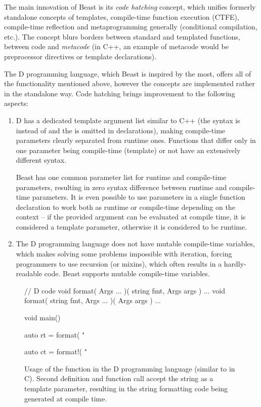 \documentclass{ExcelAtFIT}
\begin{document}
The main innovation of Beast is its \textit{code hatching} concept, which unifies formerly standalone concepts of templates, compile-time function execution (CTFE), compile-time reflection and metaprogramming generally (conditional compilation, etc.). The concept blurs borders between standard and templated functions, between code and \textit{metacode} (in C++, an example of metacode would be preprocessor directives or template declarations).

The D programming language, which Beast is inspired by the most, offers all of the functionality mentioned above, however the concepts are implemented rather in the standalone way. Code hatching brings improvement to the following aspects:
\begin{enumerate}
	\item D has a dedicated template argument list similar to C++ (the syntax is  instead of  and the \inlineDCode{!} is omitted in declarations), making compile-time parameters clearly separated from runtime ones. Functions that differ only in one parameter being compile-time (template) or not have an extensively different syntax.
 
 	Beast has one common parameter list for runtime and compile-time parameters, resulting in zero syntax difference between runtime and com\-pile-time parameters. It is even possible to use parameters in a single function declaration to work both as runtime or compile-time depending on the context -- if the provided argument can be evaluated at compile time, it is considered a template parameter, otherwise it is considered to be runtime.

	\item The D programming language does not have mutable compile-time variables, which makes solving some problems impossible with iteration, forcing programmers to use recursion (or mixins), which often results in a hardly-readable code. Beast supports mutable compile-time variables.
\end{enumerate}

\begin{figure}[h]
	\begin{dcode}
		// D code
		void format( Args ... )( string fmt, Args args ) { ... }
		void format( string fmt, Args ... )( Args args ) { ... }
		
		void main() {
			auto rt = format( "%
			
			auto ct = format!( "%
		}
	\end{dcode}
	\caption{Usage of the  function in the D programming language (similar to  in C). Second  definition and function call accept the  string as a template parameter, resulting in the string formatting code being generated at compile time.}
	\label{fig:dFormat}
\end{figure}
\end{document}

